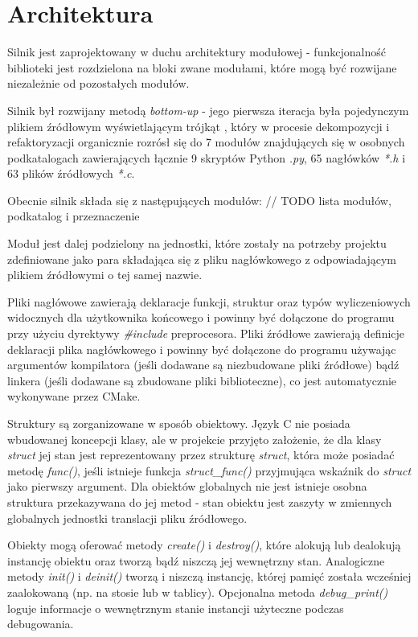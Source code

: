 \section{Architektura}

Silnik jest zaprojektowany w duchu architektury modułowej - funkcjonalność biblioteki jest rozdzielona na bloki zwane modułami, które mogą być rozwijane niezależnie od pozostałych modułów.

Silnik był rozwijany metodą \textit{bottom-up} - jego pierwsza iteracja była pojedynczym plikiem źródłowym wyświetlającym trójkąt \cite{VULKANTUTORIAL}, który w procesie dekompozycji i refaktoryzacji organicznie rozrósł się do 7 modułów znajdujących się w osobnych podkatalogach zawierających łącznie 9 skryptów Python \textit{.py}, 65 nagłówków \textit{*.h} i 63 plików źródłowych \textit{*.c}.

Obecnie silnik składa się z następujących modułów:
// TODO lista modułów, podkatalog i przeznaczenie

Moduł jest dalej podzielony na jednostki, które zostały na potrzeby projektu zdefiniowane jako para składająca się z pliku nagłówkowego z odpowiadającym plikiem źródłowymi o tej samej nazwie.

Pliki nagłówowe zawierają deklaracje funkcji, struktur oraz typów wyliczeniowych widocznych dla użytkownika końcowego i powinny być dołączone do programu przy użyciu dyrektywy \textit{\#include} preprocesora.
Pliki źródłowe zawierają definicje deklaracji plika nagłówkowego i powinny być dołączone do programu używając argumentów kompilatora (jeśli dodawane są niezbudowane pliki źródłowe) bądź linkera (jeśli dodawane są zbudowane pliki biblioteczne), co jest automatycznie wykonywane przez CMake.

Struktury są zorganizowane w sposób obiektowy.
Język C nie posiada wbudowanej koncepcji klasy, ale w projekcie przyjęto założenie, że dla klasy \textit{struct} jej stan jest reprezentowany przez strukturę \textit{struct}, która może posiadać metodę \textit{func()}, jeśli istnieje funkcja \textit{struct\_func()} przyjmująca wskaźnik do \textit{struct} jako pierwszy argument.
Dla obiektów globalnych nie jest istnieje osobna struktura przekazywana do jej metod - stan obiektu jest zaszyty w zmiennych globalnych jednostki translacji pliku źródłowego.

Obiekty mogą oferować metody \textit{create()} i \textit{destroy()}, które alokują lub dealokują instancję obiektu oraz tworzą bądź niszczą jej wewnętrzny stan.
Analogiczne metody \textit{init()} i \textit{deinit()} tworzą i niszczą instancję, której pamięć została wcześniej zaalokowaną (np. na stosie lub w tablicy).
Opcjonalna metoda \textit{debug\_print()} loguje informacje o wewnętrznym stanie instancji użyteczne podczas debugowania.

